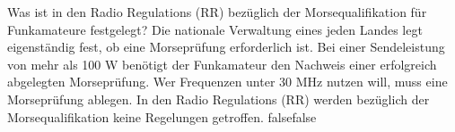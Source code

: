     {Was ist in den Radio Regulations (RR) bezüglich der Morsequalifikation für Funkamateure festgelegt?}
    {Die nationale Verwaltung eines jeden Landes legt eigenständig fest, ob eine Morseprüfung erforderlich ist.}
    {Bei einer Sendeleistung von mehr als 100 W benötigt der Funkamateur den Nachweis einer erfolgreich abgelegten Morseprüfung.}
    {Wer Frequenzen unter 30 MHz nutzen will, muss eine Morseprüfung ablegen.}
    {In den Radio Regulations (RR) werden bezüglich der Morsequalifikation keine Regelungen getroffen.}
    {false}{false}